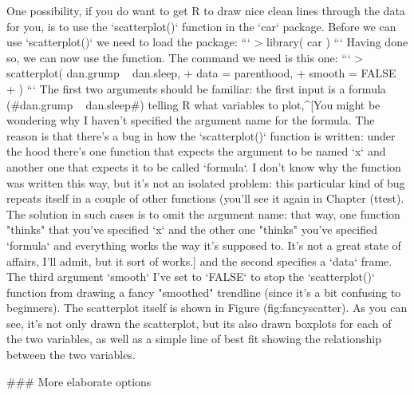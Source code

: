 One possibility, if you do want to get R to draw nice clean lines through the data for you, is to use the `scatterplot()` function in the `car` package. Before we can use `scatterplot()` we need to load the package:
```
> library( car )
```
Having done so, we can now use the function. The command we need is this one:
```
> scatterplot( dan.grump ~ dan.sleep,
+              data = parenthood, 
+              smooth = FALSE
+ )
```
The first two arguments should be familiar: the first input is a formula (\rtextverb#dan.grump ~ dan.sleep#) telling R what variables to plot,^[You might be wondering why I haven't specified the argument name for the formula. The reason is that there's a bug in how the `scatterplot()` function is written: under the hood there's one function that expects the argument to be named `x` and another one that expects it to be called `formula`. I don't know why the function was written this way, but it's not an isolated problem: this particular kind of bug repeats itself in a couple of other functions (you'll see it again in Chapter \@ref(ttest). The solution in such cases is to omit the argument name: that way, one function "thinks" that you've specified `x` and the other one "thinks" you've specified `formula` and everything works the way it's supposed to. It's not a great state of affairs, I'll admit, but it sort of works.] and the second specifies a `data` frame. The third argument `smooth` I've set to `FALSE` to stop the `scatterplot()` function from drawing a fancy "smoothed" trendline (since it's a bit confusing to beginners). The scatterplot itself is shown in Figure \@ref(fig:fancyscatter). As you can see, it's not only drawn the scatterplot, but its also drawn boxplots for each of the two variables, as well as a simple line of best fit showing the relationship between the two variables. 

 

### More elaborate options


